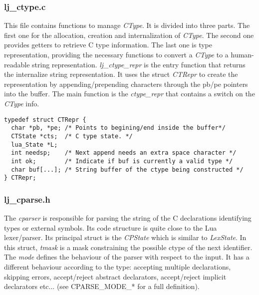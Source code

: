\subsubsection{lj\_ctype.c}
This file contains functions to manage \emph{CType}. It is divided into three
parts. The first one for the allocation, creation and internalization of
\emph{CType}. The second one provides getters to retrieve C type information.
The last one is  type representation, providing the necessary functions to
convert a \emph{CType} to a human-readable string representation.
\emph{lj\_ctype\_repr} is the entry function that returns the internalize string
representation. It uses the struct \emph{CTRepr} to create the
representation by appending/prepending characters through the pb/pe pointers
into the buffer. The main function is the \emph{ctype\_repr} that contains a
switch on the \emph{CType} info.

\begin{lstlisting}[style=CStyle]
typedef struct CTRepr {
  char *pb, *pe; /* Points to begining/end inside the buffer*/
  CTState *cts;  /* C type state. */
  lua_State *L;
  int needsp;    /* Next append needs an extra space character */
  int ok;        /* Indicate if buf is currently a valid type */
  char buf[...]; /* String buffer of the ctype being constructed */
} CTRepr;
\end{lstlisting}

\subsubsection{lj\_cparse.h}
The \textit{cparser} is responsible for parsing the string of the C declarations identifying types or external symbols. Its code structure is quite close to the
Lua lexer/parser. Its principal struct is the \emph{CPState} which is
similar to \emph{LexState}. In this struct, \emph{tmask} is a mask constraining
the possible ctype of the next identifier. The \emph{mode} defines the behaviour
of the parser with respect to the input. It has a different behaviour according to the type: accepting multiple declarations, skipping errors, accept/reject abstract
declarators, accept/reject implicit declarators etc... (see CPARSE\_MODE\_* for a
full definition).

